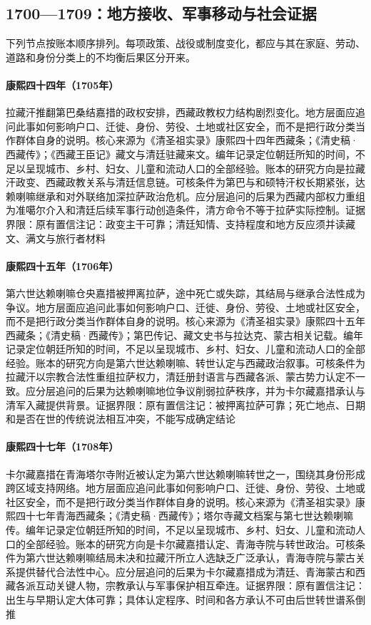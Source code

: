 \subsection{1700—1709：地方接收、军事移动与社会证据}
下列节点按账本顺序排列。每项政策、战役或制度变化，都应与其在家庭、劳动、道路和身份分类上的不均衡后果区分开来。
\hypertarget{social:EQ-1705-LHAZANG-TAKEOVER}{}\paragraph{康熙四十四年（1705年）}拉藏汗推翻第巴桑结嘉措的政权安排，西藏政教权力结构剧烈变化。地方层面应追问此事如何影响户口、迁徙、身份、劳役、土地或社区安全，而不是把行政分类当作群体自身的说明。核心来源为《清圣祖实录》康熙四十四年西藏条；《清史稿·西藏传》；《西藏王臣记》藏文与清廷驻藏来文。编年记录定位朝廷所知的时间，不足以呈现城市、乡村、妇女、儿童和流动人口的全部经验。账本的研究方向是拉藏汗政变、西藏政教关系与清廷信息链。可核条件为第巴与和硕特汗权长期紧张，达赖喇嘛继承和对外联络加深拉萨政治危机。应分层追问的后果为西藏内部权力重组为准噶尔介入和清廷后续军事行动创造条件，清方命令不等于拉萨实际控制。证据界限：原有置信注记：政变主干可靠；清廷知情、支持程度和地方反应须并读藏文、满文与旅行者材料
\hypertarget{social:EQ-1706-SIXTH-DALAI}{}\paragraph{康熙四十五年（1706年）}第六世达赖喇嘛仓央嘉措被押离拉萨，途中死亡或失踪，其结局与继承合法性成为争议。地方层面应追问此事如何影响户口、迁徙、身份、劳役、土地或社区安全，而不是把行政分类当作群体自身的说明。核心来源为《清圣祖实录》康熙四十五年西藏条；《清史稿·西藏传》；第巴传记、藏文史书与拉达克、蒙古相关记载。编年记录定位朝廷所知的时间，不足以呈现城市、乡村、妇女、儿童和流动人口的全部经验。账本的研究方向是第六世达赖喇嘛、转世认定与西藏政治叙事。可核条件为拉藏汗以宗教合法性重组拉萨权力，清廷册封语言与西藏各派、蒙古势力认定不一致。应分层追问的后果为达赖喇嘛地位争议削弱拉萨秩序，并为卡尔藏嘉措承认与清军入藏提供背景。证据界限：原有置信注记：被押离拉萨可靠；死亡地点、日期和是否在世的传统说法相互冲突，不能写成确定结论
\hypertarget{social:EQ-1708-KELZANG}{}\paragraph{康熙四十七年（1708年）}卡尔藏嘉措在青海塔尔寺附近被认定为第六世达赖喇嘛转世之一，围绕其身份形成跨区域支持网络。地方层面应追问此事如何影响户口、迁徙、身份、劳役、土地或社区安全，而不是把行政分类当作群体自身的说明。核心来源为《清圣祖实录》康熙四十七年青海西藏条；《清史稿·西藏传》；塔尔寺藏文档案与第七世达赖喇嘛传。编年记录定位朝廷所知的时间，不足以呈现城市、乡村、妇女、儿童和流动人口的全部经验。账本的研究方向是卡尔藏嘉措认定、青海寺院与转世政治。可核条件为第六世达赖喇嘛结局未决和拉藏汗所立人选缺乏广泛承认，青海寺院与蒙古关系提供替代合法性中心。应分层追问的后果为卡尔藏嘉措成为清廷、青海蒙古和西藏各派互动关键人物，宗教承认与军事保护相互牵连。证据界限：原有置信注记：出生与早期认定大体可靠；具体认定程序、时间和各方承认不可由后世转世谱系倒推
